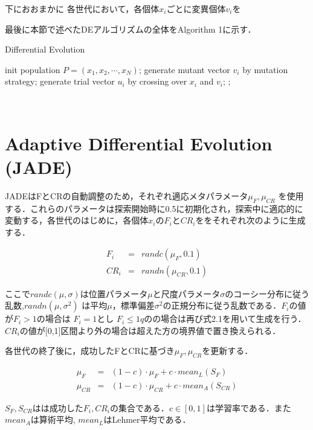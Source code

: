 \documentclass[a4paper,11pt,oneside,openany]{jsbook}
\begin{document}
下におおまかに
各世代において，各個体${x_i}$ごとに変異個体${v_i}$を

最後に本節で述べたDEアルゴリズムの全体をAlgorithm 1に示す．
\begin{algorithm}                      
\caption{Differential Evolution}         
\label{alg:pbnf}                          
\begin{algorithmic}  
\STATE init population ${P} = (x_1, x_2, \cdots, x_N)$;
        \STATE generate mutant vector {$v_i$} by mutation strategy;
        \STATE generate trial vector {$u_i$} by crossing over {$x_i$} and {$v_i$}; 
    \ENDFOR
            ;
        \ENDIF
    \ENDFOR
\ENDWHILE
\end{algorithmic}
\end{algorithm}　　　　　　　　　　　　　　　　　　　　　


\section{Adaptive Differential Evolution (JADE)}
JADEはFとCRの自動調整のため，それぞれ適応メタパラメータ$\mu _F,\mu _{CR}$ を使用する．これらのパラメータは探索開始時に0.5に初期化され，探索中に適応的に変動する，各世代のはじめに，各個体$x_i$の$F_i$と$CR_i$ををそれぞれ次のように生成する．

\begin{eqnarray}
  F_i & = & randc(\mu _F, 0.1) \\
  CR_i & = & randn(\mu _{CR}, 0.1)
\end{eqnarray}

ここで$randc(\mu,　\sigma)$は位置パラメータ$\mu$と尺度パラメータ$\sigma$のコーシー分布に従う乱数,$randn(\mu,\sigma^2)$ は平均$\mu$，標準偏差$\sigma^2$の正規分布に従う乱数である．$F_i$の値が$F_i>1$の場合は
$F_i　= 1$とし $F_i\le1qの$の場合は再び式2.1を用いて生成を行う．$CR_i$の値が[0,1]区間より外の場合は超えた方の境界値で置き換えられる．

各世代の終了後に，成功したFとCRに基づき$\mu _F, \mu _{CR}$を更新する．

\begin{eqnarray}
  \mu_F & = & (1 - c)\cdot\mu _F + c\cdot mean_L(S_F)\\
  \mu_{CR} & = & (1 - c)\cdot\mu _{CR} + c\cdot mean_A(S_{CR})
\end{eqnarray}

$S_F,S_{CR}$はは成功した$F_i,CR_i$の集合である．$c\in[0,1]$は学習率である．また$mean_A$は算術平均, $mean_L$はLehmer平均である．
\end{document}
